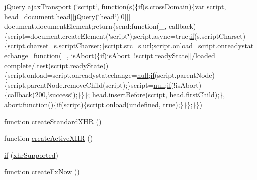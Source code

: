 \begin{DoxyCompactItemize}
\hyperlink{xe__solid__enterprise__login_2js_2login_8js_a5d40f04b6bb824963a42ec4b5fbfe262}{j\+Query} \hyperlink{jquery-1_8x_8js_ade7f5e1842214b9c2ed0c201344a110c}{ajax\+Transport} (\char`\"{}script\char`\"{}, function(\hyperlink{respond_8min_8js_ad9a7d92cb87932d25187fdec3ba1b621}{s})\{\hyperlink{menu_2tpl_2js_2jquery_8jstree_8js_acba95bef569cfaee32c4ed0212b2bb92}{if}(s.\+cross\+Domain)\{var script, head=document.\+head$\vert$$\vert$\hyperlink{xe__solid__enterprise__login_2js_2login_8js_a5d40f04b6bb824963a42ec4b5fbfe262}{j\+Query}(\char`\"{}head\char`\"{})\mbox{[}0\mbox{]}$\vert$$\vert$document.\+document\+Element;return\{send\+:function(\+\_\+, callback)\{script=document.\+create\+Element(\char`\"{}script\char`\"{});script.\+async=true;\hyperlink{menu_2tpl_2js_2jquery_8jstree_8js_acba95bef569cfaee32c4ed0212b2bb92}{if}(s.\+script\+Charset)\{script.\+charset=s.\+script\+Charset;\}script.\+src=\hyperlink{swfupload_8js_a440a52a9004fdab0700100a6ddb49f67}{s.\+url};script.\+onload=script.\+onreadystatechange=function(\+\_\+, is\+Abort)\{\hyperlink{menu_2tpl_2js_2jquery_8jstree_8js_acba95bef569cfaee32c4ed0212b2bb92}{if}(is\+Abort$\vert$$\vert$!script.\+ready\+State$\vert$$\vert$/loaded$\vert$complete/.test(script.\+ready\+State))\{script.\+onload=script.\+onreadystatechange=\hyperlink{modernizr_8min_8js_a286f9ec831c5e676eeb493248eab9575}{null};\hyperlink{menu_2tpl_2js_2jquery_8jstree_8js_acba95bef569cfaee32c4ed0212b2bb92}{if}(script.\+parent\+Node)\{script.\+parent\+Node.\+remove\+Child(script);\}script=\hyperlink{modernizr_8min_8js_a286f9ec831c5e676eeb493248eab9575}{null};\hyperlink{menu_2tpl_2js_2jquery_8jstree_8js_acba95bef569cfaee32c4ed0212b2bb92}{if}(!is\+Abort)\{callback(200,\char`\"{}success\char`\"{});\}\}\};   head.\+insert\+Before(script, head.\+first\+Child);\}, abort\+:function()\{\hyperlink{menu_2tpl_2js_2jquery_8jstree_8js_acba95bef569cfaee32c4ed0212b2bb92}{if}(script)\{script.\+onload(\hyperlink{menu_2tpl_2js_2jquery_8tmpl_8js_a08113a236cc18d2a9d5ce27e638012be}{undefined}, true);\}\}\};\}\})
\item 
function \hyperlink{jquery-1_8x_8js_acea019a8b67e4d114deb75d1e0b3474a}{create\+Standard\+X\+HR} ()
\item 
function \hyperlink{jquery-1_8x_8js_a54bf63f1b5f905292db45a1d6a9dc300}{create\+Active\+X\+HR} ()
\item 
\hyperlink{jquery-1_8x_8js_ae2dd433d7bb020adf83db5351a0671e1}{if} (\hyperlink{jquery-1_8x_8js_afd7e72f2f357a5a8b17e46776a6283eb}{xhr\+Supported})
\item 
function \hyperlink{jquery-1_8x_8js_a3c7bcef859b0811abb1dbf890c6cc635}{create\+Fx\+Now} ()

\end{DoxyCompactItemize}
